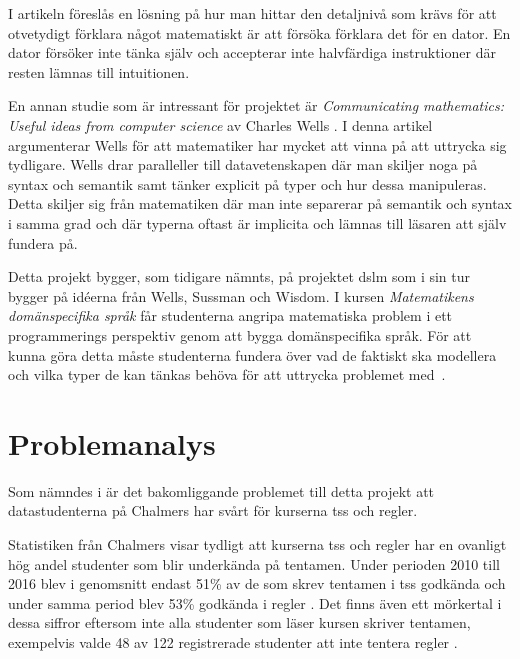 \documentclass[12pt,a4paper,twoside,openright]{article}
\begin{document}
I artikeln föreslås en lösning på hur man hittar den detaljnivå som
krävs för att otvetydigt förklara något matematiskt är att försöka
förklara det för en dator. En dator försöker inte tänka själv och
accepterar inte halvfärdiga instruktioner där resten lämnas till
intuitionen.

En annan studie som är intressant för projektet är
\textit{Communicating mathematics: Useful ideas from computer science}
av Charles Wells \cite{wells1995communicating}. I denna artikel
argumenterar Wells för att matematiker har mycket att vinna på att
uttrycka sig tydligare. Wells drar paralleller till datavetenskapen
där man skiljer noga på syntax och semantik samt tänker explicit på
typer och hur dessa manipuleras. Detta skiljer sig från matematiken
där man inte separerar på semantik och syntax i samma grad och där
typerna oftast är implicita och lämnas till läsaren att själv fundera
på.

Detta projekt bygger, som tidigare nämnts, på projektet \gls{dslm} som
i sin tur bygger på idéerna från Wells, Sussman och Wisdom.  I kursen
\textit{Matematikens domänspecifika språk} får studenterna
angripa matematiska problem i ett programmerings perspektiv
genom att bygga domänspecifika språk. För att kunna göra detta måste
studenterna fundera över vad de faktiskt ska modellera och vilka typer
de kan tänkas behöva för att uttrycka problemet
med~\cite{kursplan:dslsofmath}.

\newpage

\section{Problemanalys}

Som nämndes i  är det bakomliggande
problemet till detta projekt att datastudenterna
på Chalmers har svårt för kurserna \gls{tss} och \gls{regler}.

Statistiken från Chalmers visar tydligt att kurserna \gls{tss} och
\gls{regler} har en ovanligt hög andel studenter som blir underkända
på tentamen. Under perioden 2010 till 2016 blev i genomsnitt endast
51\% av de som skrev tentamen i \gls{tss} godkända och under samma
period blev 53\% godkända i \gls{regler} \cite{tentastatistik}.
Det finns även ett mörkertal i dessa siffror eftersom inte alla
studenter som läser kursen skriver tentamen, exempelvis valde 48 av
122 registrerade studenter att inte tentera \gls{regler}
\cite{kursinformation:ere102:14-15}.
\end{document}
